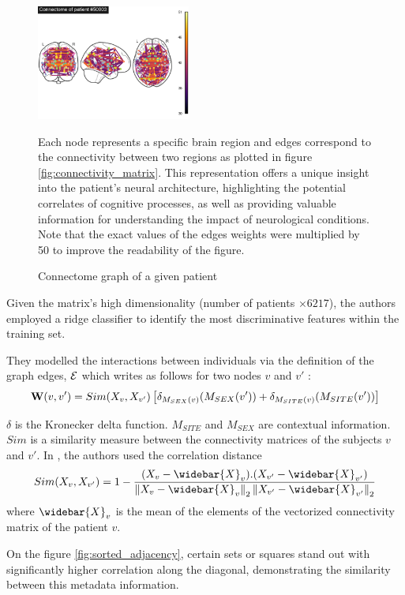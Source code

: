 \begin{figure}[h!]
    \centering
    \includegraphics[width=0.45\textwidth]{figures/ex_connectivity_pitt_ASD.png}
    \caption{Connectome graph of a given patient}  Each node represents a specific brain region and edges correspond to the connectivity between two regions as plotted in figure \ref{fig:connectivity_matrix}. This representation offers a unique insight into the patient's neural architecture, highlighting the potential correlates of cognitive processes, as well as providing valuable information for understanding the impact of neurological conditions. Note that the exact values of the edges weights were multiplied by 50 to improve the readability of the figure.
    \Description{}
    \label{fig:connectome}
\end{figure}

Given the matrix's high dimensionality (number of patients $\times 6217$), the authors employed a ridge classifier to identify the most discriminative features within the training set.

They modelled the interactions between individuals via the definition of the graph edges, $\mathcal{E}$ which writes as follows for two nodes $v$ and $v'$ :
$$ 
    \mathbf{W}(v, v') = Sim(X_v, X_{v'}) \left[\delta_{M_{SEX}(v)}(M_{SEX}(v')) + \delta_{M_{SITE}(v)}(M_{SITE}(v')) \right]
$$

$\delta$ is the Kronecker delta function.  $M_{SITE}$ and $M_{SEX}$ are contextual information. $Sim$ is a similarity measure between the connectivity matrices of the subjects $v$ and $v'$. In \cite{Parisot17}, the authors used the correlation distance 
$$
Sim(X_v, X_{v'}) =  1 - \frac{(X_v - \widebar{X}_v).(X_{v'} - \widebar{X}_{v'})}{\norm{X_v -\widebar{X}_{v}}_2\norm{X_{v'} - \widebar{X}_{v'}}_2}
$$
where $\widebar{X}_v$ is the mean of the elements of the vectorized connectivity matrix of the patient $v$. 

On the figure \ref{fig:sorted_adjacency}, certain sets or squares stand out with significantly higher correlation along the diagonal, demonstrating the similarity between this metadata information. 

